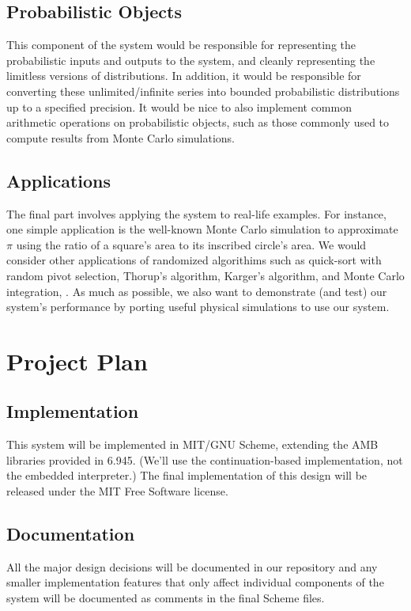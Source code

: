 \documentclass[11pt]{article}
\begin{document}
\subsection{Probabilistic Objects}
This component of the system would be responsible for representing the probabilistic inputs and outputs to the system, and cleanly representing the limitless versions of distributions. In addition, it would be responsible for converting these unlimited/infinite series into bounded probabilistic distributions up to a specified precision. It would be nice to also implement common arithmetic operations on probabilistic objects, such as those commonly used to compute results from Monte Carlo simulations.

\subsection{Applications}
The final part involves applying the system to real-life examples. For instance, one simple application is the well-known Monte Carlo simulation to approximate $\pi$ using the ratio of a square's area to its inscribed circle's area. We would consider other applications of randomized algorithims such as quick-sort with random pivot selection, Thorup's algorithm, Karger's algorithm, and Monte Carlo integration, . As much as possible, we also want to demonstrate (and test) our system's performance by porting useful physical simulations to use our system.

\section{Project Plan}
\subsection{Implementation}
This system will be implemented in MIT/GNU Scheme, extending the AMB libraries provided in 6.945.  (We'll use the continuation-based implementation, not the embedded interpreter.)  The final implementation of this design will be released under the MIT Free Software license.

\subsection{Documentation}
All the major design decisions will be documented in our repository and any smaller implementation features that only affect individual components of the system will be documented as comments in the final Scheme files.
\end{document}
